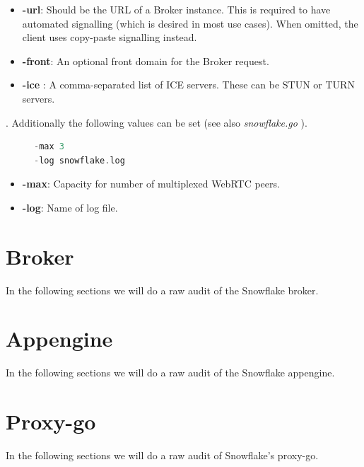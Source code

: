 \documentclass{amsart}
\theoremstyle{definition}
\theoremstyle{remark}
\numberwithin{equation}{section}
\begin{document}
\begin{itemize}
    \item \textbf{-url}: Should be the URL of a Broker instance. This is required to have
automated signalling (which is desired in most use cases).
When omitted, the client uses copy-paste signalling instead.
    \item \textbf{-front}: An optional front domain for the Broker request.
    \item \textbf{-ice }: A comma-separated list of ICE servers. These can be STUN or TURN
servers.
\end{itemize}

. Additionally the following values can be set (see also \textit{snowflake.go} \cite{SnowflakeGitClient}).

\begin{figure}[H]
\begin{lstlisting}[frame=single, language=C, caption=torrc-Config: Snowflake client additional values]
-max 3
-log snowflake.log
\end{lstlisting}
\label{fig:torrcconfigsnowflakeclientadditional}
\end{figure}

\begin{itemize}
    \item \textbf{-max}: Capacity for number of multiplexed WebRTC peers.
    \item \textbf{-log}: Name of log file.
\end{itemize}
\section{Broker}
\label{s:broker}
In the following sections we will do a raw audit of the Snowflake broker.
\section{Appengine}
\label{s:appengine}
In the following sections we will do a raw audit of the Snowflake appengine.
\section{Proxy-go}
\label{s:proxygo}
In the following sections we will do a raw audit of Snowflake's proxy-go.
\end{document}

